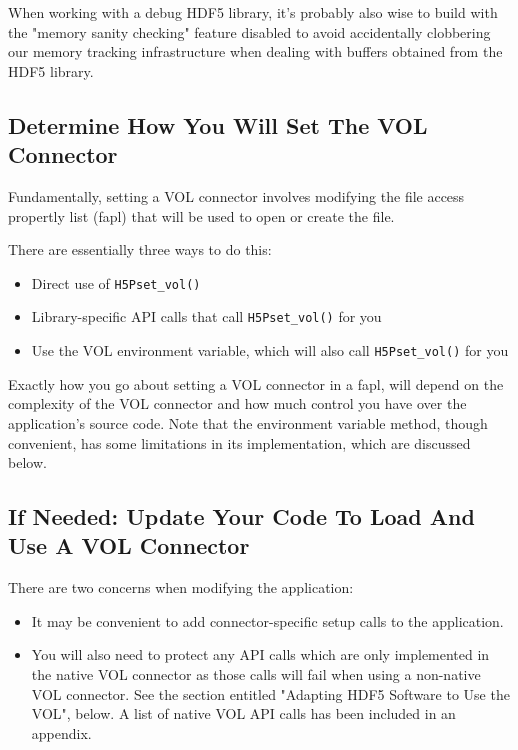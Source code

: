 When working with a debug HDF5 library, it's probably also wise to build with the "memory sanity checking" feature disabled to avoid accidentally clobbering our memory tracking infrastructure when dealing with buffers obtained from the HDF5 library.

\subsection{Determine How You Will Set The VOL Connector}

Fundamentally, setting a VOL connector involves modifying the file access propertly list (fapl) that will be used to open or create the file.

There are essentially three ways to do this:

\begin{itemize}
    \item Direct use of {\tt H5Pset\_vol()}
    \item Library-specific API calls that call {\tt H5Pset\_vol()} for you
    \item Use the VOL environment variable, which will also call {\tt H5Pset\_vol()} for you
\end{itemize}

Exactly how you go about setting a VOL connector in a fapl, will depend on the complexity of the VOL connector and how much control you have over the application's source code.
Note that the environment variable method, though convenient, has some limitations in its implementation, which are discussed below.

\subsection{If Needed: Update Your Code To Load And Use A VOL Connector}

There are two concerns when modifying the application:

\begin{itemize}
    \item It may be convenient to add connector-specific setup calls to the application.

    \item You will also need to protect any API calls which are only implemented in the native VOL connector as those calls will fail when using a non-native VOL connector. See the section entitled "Adapting HDF5 Software to Use the VOL", below. A list of native VOL API calls has been included in an appendix.
\end{itemize}

